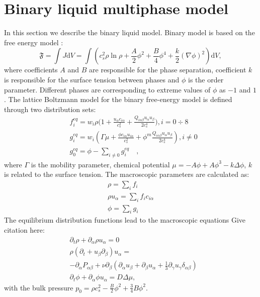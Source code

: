 \documentclass[mathpazo]{cicp}
\begin{document}
\section{Binary liquid multiphase model}
\label{sec:binary_free_energy}
In this section we describe the binary liquid model. Binary model is based on
the free energy model \cite{swift,landau}:
\begin{equation}
\mathfrak{F}=\int{J \mathrm{d}V}=\int{\left(c_s^2\rho\ln\rho+\frac{A}{2}\phi^2+\frac{B}{4}\phi^4 + \frac{k}{2}(\nabla \phi)^2 \right)\mathrm{d}V},
\end{equation}
where coefficients $A$ and $B$ are responsible for the phase separation,
coefficient $k$ is responsible for the surface tension between phases and
$\phi$ is the order parameter. Different phases are corresponding to
extreme values of $\phi$ as $-1$ and $1$.
The lattice Boltzmann model for the binary free-energy model is defined
through two distribution sets:
\begin{equation}
\begin{aligned}
&f_i^{eq}=w_i \rho \biggl(1+\frac{u_{\alpha}c_{i\alpha}}{c_s^2}+\frac{Q_{i\alpha\beta}u_{\alpha}u_{\beta}}{2 c_s^4}\biggr), i=0\div8\\
&g_i^{eq}=w_i(\Gamma \mu + \frac{\phi c_{i\alpha} u_{i\alpha}}{c_s^2}+\phi^m \frac{Q_{i\alpha\beta}u_{\alpha}u_{\beta}}{2 c_s^4}), i\neq0 \\
&g_0^{eq}=\phi-\sum_{i\neq0}{g_i^{eq}}\quad,
\end{aligned}
\end{equation}
where $\Gamma$ is the mobility parameter, chemical potential
$\mu=-A\phi+A\phi^3-k\Delta\phi$, $k$ is related to the surface
tension. The macroscopic parameters are calculated as:
\begin{equation}
\begin{aligned}
\rho=\sum_i{f_i}\\
\rho u_{\alpha}=\sum_i{f_i c_{i\alpha}}\\
\phi=\sum_i{g_i}
\end{aligned}
\end{equation}
The equilibrium distribution functions lead to the macroscopic equations
{\color{red} Give citation here}:
\begin{equation}
\begin{aligned}
&\partial_t \rho+ \partial_{\alpha} \rho u_{\alpha}=0\\
&\rho\left(\partial_t+u_{\beta}\partial_{\beta}\right) u_{\alpha}=\\
&-\partial_{\alpha}P_{\alpha \beta} + \nu\partial_{\beta}\left(\partial_{\alpha}u_{\beta}+\partial_{\beta} u_{\alpha} + \frac{1}{3}\partial_{\gamma} u_{\gamma} \delta_{\alpha\beta}\right)\\
&\partial_t \phi + \partial_{\alpha} \phi u_{\alpha}=D\Delta \mu,
\end{aligned}
\label{binary:fluid:system}
\end{equation}
with the bulk pressure $p_0=\rho c_s^2-\frac{B}{2}\phi^2+\frac{3}{4}B \phi^2$.
\end{document}
